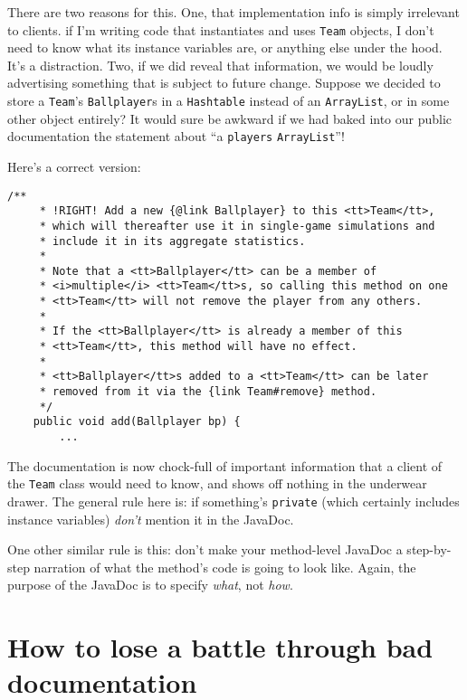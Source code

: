 There are two reasons for this. One, that implementation info is simply
irrelevant to clients. if I'm writing code that instantiates and uses
\texttt{Team} objects, I don't need to know what its instance variables are, or
anything else under the hood. It's a distraction. Two, if we did reveal that
information, we would be loudly advertising something that is subject to future
change. Suppose we decided to store a \texttt{Team}'s \texttt{Ballplayer}s in a
\texttt{Hashtable} instead of an \texttt{ArrayList}, or in some other object
entirely? It would sure be awkward if we had baked into our public
documentation the statement about ``a \texttt{players} \texttt{ArrayList}''!

Here's a correct version:

\vspace{-.15in}
\begin{Verbatim}[fontsize=\scriptsize,samepage=true,frame=single]
    /**
     * !RIGHT! Add a new {@link Ballplayer} to this <tt>Team</tt>,
     * which will thereafter use it in single-game simulations and
     * include it in its aggregate statistics.
     *
     * Note that a <tt>Ballplayer</tt> can be a member of
     * <i>multiple</i> <tt>Team</tt>s, so calling this method on one
     * <tt>Team</tt> will not remove the player from any others.
     *
     * If the <tt>Ballplayer</tt> is already a member of this
     * <tt>Team</tt>, this method will have no effect.
     * 
     * <tt>Ballplayer</tt>s added to a <tt>Team</tt> can be later
     * removed from it via the {link Team#remove} method.
     */
    public void add(Ballplayer bp) {
        ...
\end{Verbatim}


The documentation is now chock-full of important information that a client of
the \texttt{Team} class would need to know, and shows off nothing in the
underwear drawer. The general rule here is: if something's \texttt{private}
(which certainly includes instance variables) \textit{don't} mention it in the
JavaDoc.

\medskip


One other similar rule is this: don't make your method-level JavaDoc a
step-by-step narration of what the method's code is going to look like. Again,
the purpose of the JavaDoc is to specify \textit{what}, not \textit{how}.

\section[How to lose a battle]{How to lose a battle through bad documentation}

